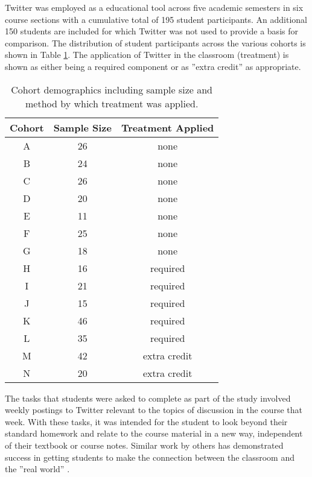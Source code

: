 \documentclass[12pt]{article}
\begin{document}
Twitter was employed as a educational tool across five academic semesters in six course sections with a cumulative total of 195 student participants. An additional 150 students are included for which Twitter was not used to provide a basis for comparison. The distribution of student participants across the various cohorts is shown in Table \ref{cohortDemo}. The application of Twitter in the classroom (treatment) is shown as either being a required component or as ''extra credit'' as appropriate.

\begin{table}[H]
\caption{Cohort demographics including sample size and method by which treatment was applied.}
\begin{center}
\label{cohortDemo}
\begin{tabular}{ccc}
\hline
 Cohort & Sample Size & Treatment Applied \\
\hline
 A & 26 & none \\ 
 B & 24 & none \\ 
 C & 26 & none \\ 
 D & 20 & none \\ 
 E & 11 & none \\ 
 F & 25 & none \\
 G & 18 & none \\
 H & 16 & required \\ 
 I & 21 & required \\ 
 J & 15 & required \\ 
 K & 46 & required \\ 
 L & 35 & required \\ 
 M & 42 & extra credit \\ 
 N & 20 & extra credit \\ 
\hline
\end{tabular}
\end{center}
\end{table}

The tasks that students were asked to complete as part of the study involved weekly postings to Twitter relevant to the topics of discussion in the course that week. With these tasks, it was intended for the student to look beyond their standard homework and relate to the course material in a new way, independent of their textbook or course notes. Similar work by others has demonstrated success in getting students to make the connection between the classroom and the ''real world'' \cite{hopp_journal_2008}.
\end{document}
